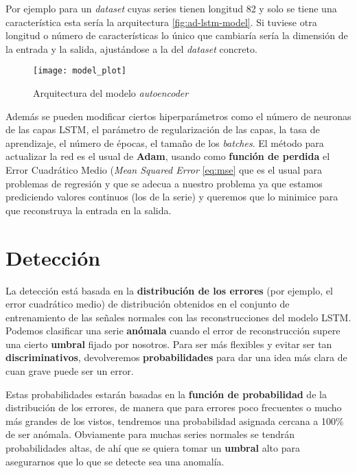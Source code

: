 Por ejemplo para un \emph{dataset} cuyas series tienen longitud 82 y solo se tiene una característica esta sería la arquitectura \autoref{fig:ad-lstm-model}. Si tuviese otra longitud o número de características lo único que cambiaría sería la dimensión de la entrada y la salida, ajustándose a la del \emph{dataset} concreto.

\begin{figure}[htpb]
  \centering
  \texttt{[image: model\_plot]}
  \caption{Arquitectura del modelo \emph{autoencoder}}
  \label{fig:ad-lstm-model}
\end{figure}

Además se pueden modificar ciertos hiperparámetros como el número de neuronas de las capas LSTM, el parámetro de regularización de las capas, la tasa de aprendizaje, el número de épocas, el tamaño de los \emph{batches}. El método para actualizar la red es el usual de \textbf{Adam}, usando como \textbf{función de perdida} el Error Cuadrático Medio (\emph{Mean Squared Error} \eqref{eq:mse} que es el usual para problemas de regresión y que se adecua a nuestro problema ya que estamos prediciendo valores continuos (los de la serie) y queremos que lo minimice para que reconstruya la entrada en la salida.

\section{Detección}

La detección está basada en la \textbf{distribución de los errores} (por ejemplo, el error cuadrático medio) de distribución obtenidos en el conjunto de entrenamiento de las señales normales con las reconstrucciones del modelo LSTM. Podemos clasificar una serie \textbf{anómala} cuando el error de reconstrucción supere una cierto \textbf{umbral} fijado por nosotros. Para ser más flexibles y evitar ser tan \textbf{discriminativos}, devolveremos \textbf{probabilidades} para dar una idea más clara de cuan grave puede ser un error.

Estas probabilidades estarán basadas en la \textbf{función de probabilidad} de la distribución de los errores, de manera que para errores poco frecuentes o mucho más grandes de los vistos, tendremos una probabilidad asignada cercana a 100\% de ser anómala. Obviamente para muchas series normales se tendrán probabilidades altas, de ahí que se quiera tomar un \textbf{umbral} alto para asegurarnos que lo que se detecte sea una anomalía.

